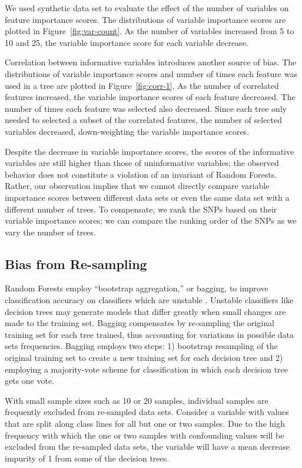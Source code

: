 We used synthetic data set to evaluate the effect of the number of variables on feature importance scores. The distributions of variable importance scores are plotted in Figure~\ref{fig:var-count}.  As the number of variables increased from 5 to 10 and 25, the variable importance score for each variable decrease.

Correlation between informative variables introduces another source of bias. The distributions of variable importance scores and number of times each feature was used in a tree are plotted in Figure~\ref{fig:corr-1}.  As the number of correlated features increased, the variable importance scores of each feature decreased.  The number of times each feature was selected also decreased.  Since each tree only needed to selected a subset of the correlated features, the number of selected variables decreased, down-weighting the variable importance scores.

Despite the decrease in variable importance scores, the scores of the informative variables are still higher than those of uninformative variables; the observed behavior does not constitute a violation of an invariant of Random Forests.  Rather, our observation implies that we cannot directly compare variable importance scores between different data sets or even the same data set with a different number of trees.  To compensate, we rank the SNPs based on their variable importance scores; we can compare the ranking order of the SNPs as we vary the number of trees.

\subsection{Bias from Re-sampling} \label{sec:resampling}
Random Forests employ ``bootstrap aggregation,'' or bagging, to improve classification accuracy on classifiers which are unstable \cite{Breiman1996}.  Unstable classifiers like decision trees may generate models that differ greatly when small changes are made to the training set.  Bagging compensates by re-sampling the original training set for each tree trained, thus accounting for variations in possible data sets frequencies.  Bagging employs two steps: 1) bootstrap resampling of the original training set to create a new training set for each decision tree and 2) employing a majority-vote scheme for classification in which each decision tree gets one vote.

With small sample sizes such as 10 or 20 samples, individual samples are frequently excluded from re-sampled data sets.  Consider a variable with values that are split along class lines for all but one or two samples. Due to the high frequency with which the one or two samples with confounding values will be excluded from the re-sampled data sets, the variable will have a mean decrease impurity of 1 from some of the decision trees. 

